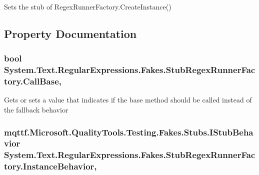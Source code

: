 Sets the stub of Regex\-Runner\-Factory.\-Create\-Instance()



\subsection{Property Documentation}
\hypertarget{class_system_1_1_text_1_1_regular_expressions_1_1_fakes_1_1_stub_regex_runner_factory_a84834e2b095d8d65d80a3720331bb1a9}{
\subsubsection[{Call\-Base}]{\setlength{\rightskip}{0pt plus 5cm}bool System.\-Text.\-Regular\-Expressions.\-Fakes.\-Stub\-Regex\-Runner\-Factory.\-Call\-Base\hspace{0.3cm}{\ttfamily [get]}, {\ttfamily [set]}}}\label{class_system_1_1_text_1_1_regular_expressions_1_1_fakes_1_1_stub_regex_runner_factory_a84834e2b095d8d65d80a3720331bb1a9}


Gets or sets a value that indicates if the base method should be called instead of the fallback behavior

\hypertarget{class_system_1_1_text_1_1_regular_expressions_1_1_fakes_1_1_stub_regex_runner_factory_a22cfd533332e4278733485b4012261ff}{
\subsubsection[{Instance\-Behavior}]{\setlength{\rightskip}{0pt plus 5cm}mqttf.\-Microsoft.\-Quality\-Tools.\-Testing.\-Fakes.\-Stubs.\-I\-Stub\-Behavior System.\-Text.\-Regular\-Expressions.\-Fakes.\-Stub\-Regex\-Runner\-Factory.\-Instance\-Behavior\hspace{0.3cm}{\ttfamily [get]}, {\ttfamily [set]}}}\label{class_system_1_1_text_1_1_regular_expressions_1_1_fakes_1_1_stub_regex_runner_factory_a22cfd533332e4278733485b4012261ff}



